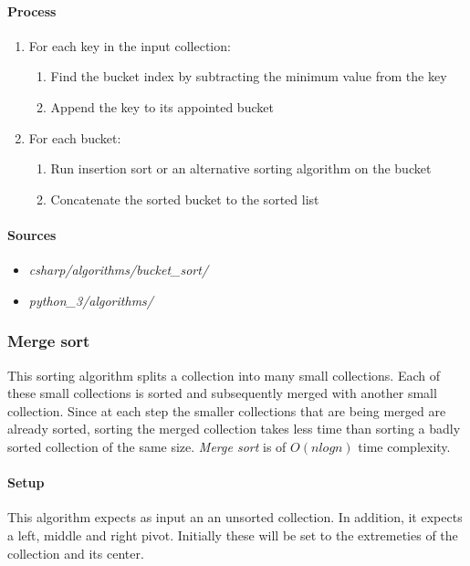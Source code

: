 \documentclass{article}
\begin{document}
\paragraph{Process}
\begin{enumerate}
\item{For each key in the input collection:}
  \begin{enumerate}
  \item{Find the bucket index by subtracting the minimum value from the key}
  \item{Append the key to its appointed bucket}
  \end{enumerate}
\item{For each bucket:}
  \begin{enumerate}
  \item{Run insertion sort or an alternative sorting algorithm on the bucket}
  \item{Concatenate the sorted bucket to the sorted list}
  \end{enumerate}
\end{enumerate}

\begin{samepage}
  \paragraph{Sources}
  \begin{itemize}
  \item{{\em csharp/algorithms/bucket\_sort/}}
  \item{{\em python\_3/algorithms/}}
  \end{itemize}
\end{samepage}


\subsubsection{Merge sort}
This sorting algorithm splits a collection into many small collections. Each of these small collections is sorted and
subsequently merged with another small collection. Since at each step the smaller collections that are being merged
are already sorted, sorting the merged collection takes less time than sorting a badly sorted collection of the same
size. {\em Merge sort} is of \(O(n log n)\) time complexity.

\paragraph{Setup}
This algorithm expects as input an an unsorted collection. In addition, it expects a left, middle and right pivot.
Initially these will be set to the extremeties of the collection and its center.
\end{document}
